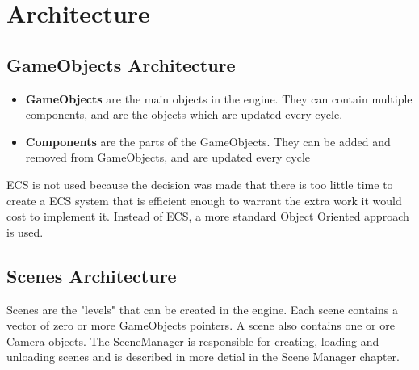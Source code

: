 \section{Architecture}
\label{sec:architecture}

\subsection{GameObjects Architecture}
\begin{itemize}
    \item \textbf{GameObjects} are the main objects in the engine. They can contain multiple components, and are the objects which are updated every cycle.
    \item \textbf{Components} are the parts of the GameObjects. They can be added and removed from GameObjects, and are updated every cycle
\end{itemize}
ECS is not used because the decision was made that there is too little time to create a ECS system that is efficient enough to warrant the extra work it would cost to implement it.
Instead of ECS, a more standard Object Oriented approach is used.

\subsection{Scenes Architecture}
Scenes are the "levels" that can be created in the engine. Each scene contains a vector of zero or more GameObjects pointers.
A scene also contains one or ore Camera objects.
The SceneManager is responsible for creating, loading and unloading scenes and is described in more detial in the Scene Manager chapter.













